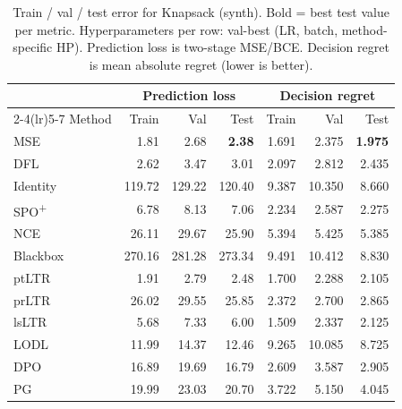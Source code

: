 \begin{table}[t]
\centering
\caption[Train/val/test error for Knapsack (synth).]{Train / val / test error for Knapsack (synth). Bold = best test value per metric. Hyperparameters per row: val-best (LR, batch, method-specific HP). Prediction loss is two-stage MSE/BCE. Decision regret is mean absolute regret (lower is better).}
\label{tab:err-knapsack}
\setlength{\tabcolsep}{4pt}
\renewcommand{\arraystretch}{1.05}
\begin{tabular}{@{}lrrrrrr@{}}
\toprule
& \multicolumn{3}{c}{Prediction loss} & \multicolumn{3}{c}{Decision regret} \\
\cmidrule(lr){2-4}\cmidrule(lr){5-7}
Method & Train & Val & Test & Train & Val & Test \\
\midrule
MSE & 1.81 & 2.68 & \textbf{2.38} & 1.691 & 2.375 & \textbf{1.975} \\
DFL & 2.62 & 3.47 & 3.01 & 2.097 & 2.812 & 2.435 \\
Identity & 119.72 & 129.22 & 120.40 & 9.387 & 10.350 & 8.660 \\
SPO\textsuperscript{+} & 6.78 & 8.13 & 7.06 & 2.234 & 2.587 & 2.275 \\
NCE & 26.11 & 29.67 & 25.90 & 5.394 & 5.425 & 5.385 \\
Blackbox & 270.16 & 281.28 & 273.34 & 9.491 & 10.412 & 8.830 \\
ptLTR & 1.91 & 2.79 & 2.48 & 1.700 & 2.288 & 2.105 \\
prLTR & 26.02 & 29.55 & 25.85 & 2.372 & 2.700 & 2.865 \\
lsLTR & 5.68 & 7.33 & 6.00 & 1.509 & 2.337 & 2.125 \\
LODL & 11.99 & 14.37 & 12.46 & 9.265 & 10.085 & 8.725 \\
DPO & 16.89 & 19.69 & 16.79 & 2.609 & 3.587 & 2.905 \\
PG & 19.99 & 23.03 & 20.70 & 3.722 & 5.150 & 4.045 \\
\bottomrule
\end{tabular}
\end{table}


